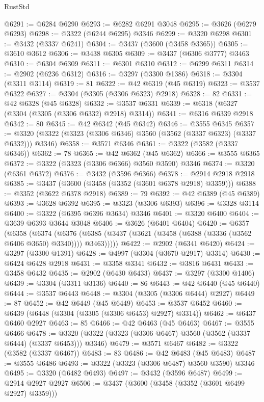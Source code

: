 \begin{lexlean}{RustStd}
\begin{coremodule}
@6291 := @6284 @6290
@6293 := @6282 @6291 @3048
@6295 := @3626 (@6279 @6293)
@6298 := @3322 (@6244 @6295) @3346
@6299 := @3320 @6298
@6301 := @3432 (@3337 @6241)
@6304 := @3437 (@3600 (@3458 @3365))
@6305 := @3610 @3612
@6306 := @3438 @6305
@6309 := @3437 (@6306 @3777) @3463
@6310 := @6304 @6309
@6311 := @6301 @6310
@6312 := @6299 @6311
@6314 := @2902 (@6236 @6312)
@6316 := @3297 (@3300 @1386)
@6318 := @3304 (@3311 @3114)
@6319 := 81
@6322 := @42 @6319 (@45 @6319)
@6323 := @3537 @6322
@6327 := @3304 (@3305 (@3306 @6323) @2918)
@6328 := 82
@6331 := @42 @6328 (@45 @6328)
@6332 := @3537 @6331
@6339 := @6318 (@6327 (@3304 (@3305 (@3306 @6332) @2918) @3314))
@6341 := @6316 @6339 @2918
@6342 := 80
@6345 := @42 @6342 (@45 @6342)
@6346 := @3555 @6345
@6357 := @3320 (@3322 (@3323 (@3306 @6346) @3560 (@3562 (@3337 @6323) (@3337 @6332))) @3346)
@6358 := @3571 @6346
@6361 := @3322 (@3582 (@3337 @6346))
@6362 := 78
@6365 := @42 @6362 (@45 @6362)
@6366 := @3555 @6365
@6372 := @3322 (@3323 (@3306 @6366) @3560 @3590) @3346
@6374 := @3320 (@6361 @6372)
@6376 := @3432 (@3596 @6366)
@6378 := @2914 @2918 @2918
@6385 := @3437 (@3600 (@3458 (@3352 (@3601 @6378 @2918) @3359)))
@6388 := @3352 (@3622 @6378 @2918)
@6389 := 79
@6392 := @42 @6389 (@45 @6389)
@6393 := @3628 @6392
@6395 := @3323 (@3306 @6393)
@6396 := @3328 @3114
@6400 := @3322 (@6395 @6396 @3634) @3346
@6401 := @3320 @6400
@6404 := @3639 @6393 @3644 @3048
@6406 := @3626 (@6401 @6404)
@6420 := @6357
    (@6358
      (@6374
        (@6376 (@6385 (@3437 (@3621 (@3458 (@6388 (@3336 (@3562 @6406 @3650) @3340)))) @3463)))))
@6422 := @2902 (@6341 @6420)
@6424 := @3297 (@3300 @1391)
@6428 := @4997 (@3304 (@3670 @2917) @3314)
@6430 := @6424 @6428 @2918
@6431 := @3358 @3341
@6432 := @3816 @6431
@6433 := @3458 @6432
@6435 := @2902 (@6430 @6433)
@6437 := @3297 (@3300 @1406)
@6439 := @3304 (@3311 @3136)
@6440 := 86
@6443 := @42 @6440 (@45 @6440)
@6444 := @3537 @6443
@6448 := @3304 (@3305 (@3306 @6444) @2927)
@6449 := 87
@6452 := @42 @6449 (@45 @6449)
@6453 := @3537 @6452
@6460 := @6439 (@6448 (@3304 (@3305 (@3306 @6453) @2927) @3314))
@6462 := @6437 @6460 @2927
@6463 := 85
@6466 := @42 @6463 (@45 @6463)
@6467 := @3555 @6466
@6478 := @3320 (@3322 (@3323 (@3306 @6467) @3560 (@3562 (@3337 @6444) (@3337 @6453))) @3346)
@6479 := @3571 @6467
@6482 := @3322 (@3582 (@3337 @6467))
@6483 := 83
@6486 := @42 @6483 (@45 @6483)
@6487 := @3555 @6486
@6493 := @3322 (@3323 (@3306 @6487) @3560 @3590) @3346
@6495 := @3320 (@6482 @6493)
@6497 := @3432 (@3596 @6487)
@6499 := @2914 @2927 @2927
@6506 := @3437 (@3600 (@3458 (@3352 (@3601 @6499 @2927) @3359)))

\end{coremodule}
\end{lexlean}
